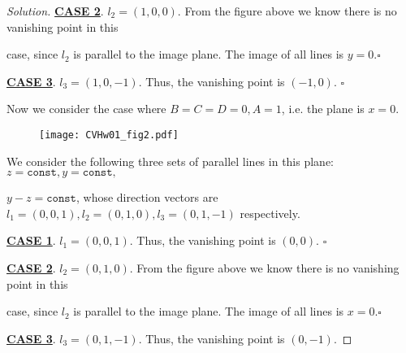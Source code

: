 \documentclass{article}
\newenvironment{solution}{\begin{proof}[\noindent\it Solution]}{\end{proof}}
\newcommand{\whiteqed}{\hfill $\square$\par}
\begin{document}
\begin{solution}
    \hspace{2.6em}
    \underline{\textbf{CASE 2}}. $l_2=(1,0,0).$ From the figure above we know there is no vanishing point in this 
    
    case, since $l_2$ is parallel to the image plane. The image of all lines is $y=0$.\whiteqed

    \hspace{2.6em}
    \underline{\textbf{CASE 3}}. $l_3=(1,0,-1).$ 
    Thus, the vanishing point is $(-1,0)$. \whiteqed

    \vspace{2em} \hspace{2.6em}
    Now we consider the case where $B=C=D=0, A=1$, i.e. the plane is $x=0$.

    \begin{figure}[htbp]
    	\centering
    	{\texttt{[image: CVHw01\_fig2.pdf]}}
    \end{figure}

    \vspace{-1.25em} \hspace{2.6em}
    We consider the following three sets of parallel lines in this plane: $z=\mathtt{const}, y=\mathtt{const},$
    
    $y-z=\mathtt{const}$, whose direction vectors are $l_1=(0,0,1), l_2=(0,1,0), l_3=(0,1,-1)$ respectively.

    \hspace{2.6em}
    \underline{\textbf{CASE 1}}. $l_1=(0,0,1).$ Thus, the vanishing point is $(0,0)$. \whiteqed

    \hspace{2.6em}
    \underline{\textbf{CASE 2}}. $l_2=(0,1,0).$ From the figure above we know there is no vanishing point in this 
    
    case, since $l_2$ is parallel to the image plane. The image of all lines is $x=0$.\whiteqed

    \hspace{2.6em}
    \underline{\textbf{CASE 3}}. $l_3=(0,1,-1).$ 
    Thus, the vanishing point is $(0,-1)$.
\end{solution}

\vspace{1em}
\end{document}
